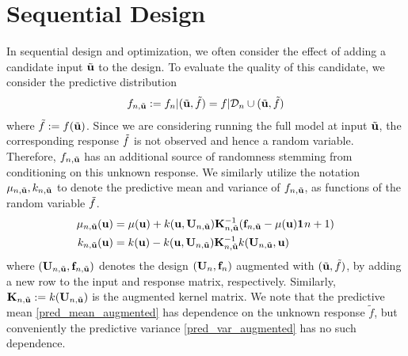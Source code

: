 \documentclass[12pt]{article}
\begin{document}
\section{Sequential Design}
In sequential design and optimization, we often consider the effect of adding a candidate input $\tilde{\bpar}$ to the design. To evaluate the quality of this candidate, we 
consider the predictive distribution
\begin{align}
\indexDesign[\designIdx, \tilde{\bpar}]{\f} := \indexDesign{\f} | (\tilde{\bpar}, \tilde{\f}) = \f | \indexDesign{\designData} \cup (\tilde{\bpar}, \tilde{\f})
\end{align}
where $\tilde{\f} := \f(\tilde{\bpar})$. Since we are considering running the full model at input $\tilde{\bpar}$, the corresponding response $\tilde{\f}$ is not 
observed and hence a random variable. Therefore, $\indexDesign[\designIdx, \tilde{\bpar}]{\f}$ has an additional source of randomness stemming from conditioning on 
this unknown response. We similarly utilize the notation $\indexDesign[\designIdx, \tilde{\bpar}]{\GPMean}, \indexDesign[\designIdx, \tilde{\bpar}]{\GPKer}$ to denote the 
predictive mean and variance of $\indexDesign[\designIdx, \tilde{\bpar}]{\f}$, as functions of the random variable $\tilde{\f}$. 
\begin{align}
\indexDesign[\designIdx,\tilde{\bpar}]{\GPMean}(\bpar) &= \GPMean(\bpar) + 
\GPKer(\bpar, \designMat[\designIdx, \tilde{\bpar}]) \KerMat[\designIdx, \tilde{\bpar}]^{-1} (\fObs[\designIdx, \tilde{\bpar}] - \GPMean(\bpar)\oneVec{\designIdx+1}) \label{pred_mean_augmented}\\
\indexDesign[\designIdx,\tilde{\bpar}]{\GPKer}(\bpar) &= \GPKer(\bpar) - 
\GPKer(\bpar, \designMat[\designIdx, \tilde{\bpar}]) \KerMat[\designIdx, \tilde{\bpar}]^{-1} \GPKer(\designMat[\designIdx, \tilde{\bpar}], \bpar) \label{pred_var_augmented}
\end{align}
where $(\designMat[\designIdx, \tilde{\bpar}], \fObs[\designIdx, \tilde{\bpar}])$ denotes the design 
$(\designMat[\designIdx], \fObs[\designIdx])$ augmented with $(\tilde{\bpar}, \tilde{\f})$, by adding a new row to the input and response matrix, respectively. 
Similarly, $\KerMat[\designIdx, \tilde{\bpar}] := \GPKer(\designMat[\designIdx, \tilde{\bpar}])$ is the augmented kernel matrix. We note that the predictive mean 
\ref{pred_mean_augmented} has dependence on the unknown response $\tilde{f}$, but conveniently the predictive variance \ref{pred_var_augmented} has no 
such dependence. 
\end{document}
